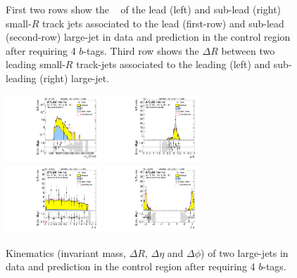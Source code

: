 \begin{figure}[htbp!]
\begin{center}
  \caption{First two rows show the \pt~ of the lead (left) and sub-lead (right) small-$R$ track jets associated to the lead (first-row) and sub-lead (second-row) large-\R jet in data and prediction in the control region after requiring 4 $b$-tags. Third row shows the $\Delta R$ between two leading small-$R$ track-jets associated to the leading (left) and sub-leading (right) large-\R jet.  }
  \label{fig:boosted-4b-control-ak2}
\end{center}
\end{figure}


\begin{figure}[htbp!]
\begin{center}
\includegraphics[width=0.32\textwidth,angle=-90]{figures/boosted/Control/b77_FourTag_Control_mHH_l_1.pdf}
\includegraphics[width=0.32\textwidth,angle=-90]{figures/boosted/Control/b77_FourTag_Control_hCandDr.pdf}\\
\includegraphics[width=0.32\textwidth,angle=-90]{figures/boosted/Control/b77_FourTag_Control_hCandDeta.pdf}
\includegraphics[width=0.32\textwidth,angle=-90]{figures/boosted/Control/b77_FourTag_Control_hCandDphi.pdf}
  \caption{Kinematics (invariant mass, $\Delta R$, $\Delta \eta$ and $\Delta \phi$) of two large-\R jets in data and prediction in the control region after requiring 4 $b$-tags.  }
  \label{fig:boosted-4b-control-ak10-system}
\end{center}
\end{figure}

